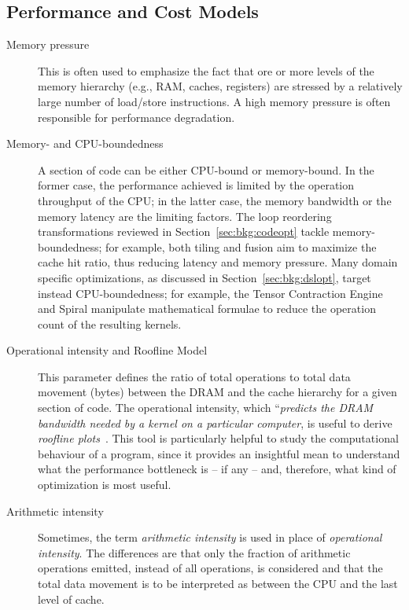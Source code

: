 \subsection*{Performance and Cost Models}
\begin{description}

\item[Memory pressure] This is often used to emphasize the fact that ore or more levels of the memory hierarchy (e.g., RAM, caches, registers) are stressed by a relatively large number of load/store instructions. A high memory pressure is often responsible for performance degradation.

\item[Memory- and CPU-boundedness] A section of code can be either CPU-bound or memory-bound. In the former case, the performance achieved is limited by the operation throughput of the CPU; in the latter case, the memory bandwidth or the memory latency are the limiting factors. The loop reordering transformations reviewed in Section~\ref{sec:bkg:codeopt} tackle memory-boundedness; for example, both tiling and fusion aim to maximize the cache hit ratio, thus reducing latency and memory pressure. Many domain specific optimizations, as discussed in Section~\ref{sec:bkg:dslopt}, target instead CPU-boundedness; for example, the Tensor Contraction Engine and Spiral manipulate mathematical formulae to reduce the operation count of the resulting kernels.

\item[Operational intensity and Roofline Model] This parameter defines the ratio of total operations to total data movement (bytes) between the DRAM and the cache hierarchy for a given section of code. The operational intensity, which ``{\it predicts the DRAM bandwidth needed by a kernel on a particular computer}, is useful to derive {\em roofline plots}~\citep{roofline-cite}. This tool is particularly helpful to study the computational behaviour of a program, since it provides an insightful mean to understand what the performance bottleneck is -- if any -- and, therefore, what kind of optimization is most useful. 

\item[Arithmetic intensity] Sometimes, the term {\em arithmetic intensity} is used in place of {\em operational intensity}. The differences are that only the fraction of arithmetic operations emitted, instead of all operations, is considered and that the total data movement is to be interpreted as between the CPU and the last level of cache.
\end{description}

